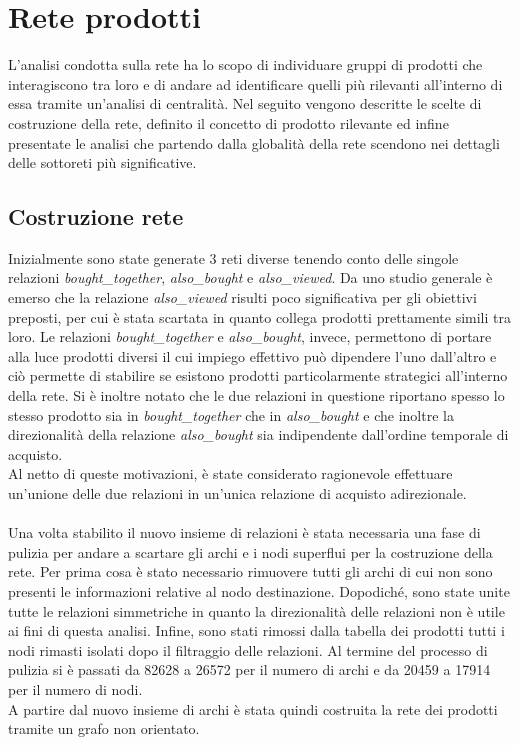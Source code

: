 \section{Rete prodotti}\label{ReteProdotti}
L'analisi condotta sulla rete ha lo scopo di individuare gruppi di prodotti che interagiscono tra loro e di andare ad identificare quelli più rilevanti all'interno di essa tramite un'analisi di centralità. Nel seguito vengono descritte le scelte di costruzione della rete, definito il concetto di prodotto rilevante ed infine presentate le analisi che partendo dalla globalità della rete scendono nei dettagli delle sottoreti più significative. 

\subsection{Costruzione rete}
Inizialmente sono state generate 3 reti diverse tenendo conto delle singole relazioni \textit{bought\_together}, \textit{also\_bought} e \textit{also\_viewed}. Da uno studio generale è emerso che la relazione \textit{also\_viewed} risulti poco significativa per gli obiettivi preposti, per cui è stata scartata in quanto collega prodotti prettamente simili tra loro. Le relazioni \textit{bought\_together} e \textit{also\_bought}, invece, permettono di portare alla luce prodotti diversi il cui impiego effettivo può dipendere l'uno dall'altro e ciò permette di stabilire se esistono prodotti particolarmente strategici all'interno della rete. Si è inoltre notato che le due relazioni in questione riportano spesso lo stesso prodotto sia in \textit{bought\_together} che in \textit{also\_bought} e che inoltre la direzionalità della relazione \textit{also\_bought} sia indipendente dall'ordine temporale di acquisto. \\
Al netto di queste motivazioni, è state considerato ragionevole effettuare un'unione delle due relazioni in un'unica relazione di acquisto adirezionale. 
\\\\
Una volta stabilito il nuovo insieme di relazioni è stata necessaria una fase di pulizia per andare a scartare gli archi e i nodi superflui per la costruzione della rete. Per prima cosa è stato necessario rimuovere tutti gli archi di cui non sono presenti le informazioni relative al nodo destinazione. Dopodiché, sono state unite tutte le relazioni simmetriche in quanto la direzionalità delle relazioni non è utile ai fini di questa analisi. Infine, sono stati rimossi dalla tabella dei prodotti tutti i nodi rimasti isolati dopo il filtraggio delle relazioni. Al termine del processo di pulizia si è passati da 82628 a 26572 per il numero di archi e da 20459 a 17914 per il numero di nodi. \\
A partire dal nuovo insieme di archi è stata quindi costruita la rete dei prodotti tramite un grafo non orientato.



